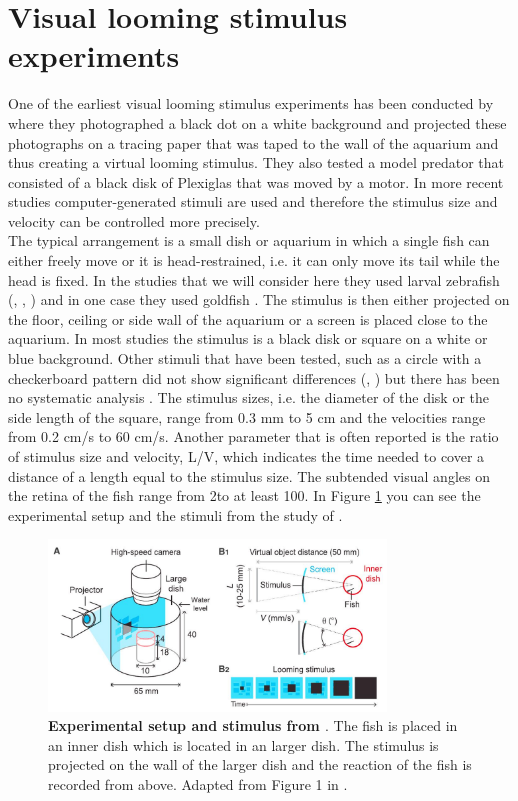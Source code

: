 \documentclass[a4paper,10pt,hidelinks]{scrreprt}
\begin{document}
	\section{Visual looming stimulus experiments}
	One of the earliest visual looming stimulus experiments has been conducted by 
	\cite{Dill1974} where they photographed a black dot on a white background and projected these 
	photographs on a tracing paper that was taped to the wall of the aquarium and thus creating a virtual looming stimulus.
	They also tested a model predator that consisted of a black disk of Plexiglas that was moved by a motor.
	In more recent studies computer-generated stimuli are used and therefore the stimulus size 
	and velocity can be controlled more precisely.\\
	The typical arrangement is a small dish or aquarium in which a single fish can either freely 
	move or it is head-restrained, i.e. it can only move its tail while the head is fixed. 
	In the studies that we will consider here they used larval zebrafish (\cite{Temizer2015}, 
	\cite{Dunn2016}, \cite{Bhattacharyya2017}) and in one case they used goldfish 
	\citep{Preuss2006}.
	The stimulus is then either projected on the floor, ceiling or side wall of the aquarium or a 
	screen is placed close to the aquarium.
	In most studies the stimulus is a black disk or square on a white or blue background.
	Other stimuli that have been tested, such as a circle with a checkerboard pattern did not show significant differences (\cite{Preuss2006}, \cite{Dunn2016}) but there has been no systematic analysis .
	The stimulus sizes, i.e. the diameter of the disk or the side length of the square, range from 0.3 mm to 5 cm and the velocities range from 0.2 cm/s to 60 cm/s.
    Another parameter that is often reported is the ratio of stimulus size and velocity, L/V, which indicates the time needed to cover a distance of a length equal to the stimulus size.
	The subtended visual angles on the retina of the fish range from 2\textdegree to at least 
	100\textdegree.
    In Figure \ref{fig:expm_setup} you can see the experimental setup and the stimuli from the study of \cite{Bhattacharyya2017}.
    \begin{figure}[H]
    	\begin{center}
			\includegraphics[width=0.8\textwidth]{bhattacharyya_exp_setup.jpeg}
    	\end{center}
    	\caption{\textbf{Experimental setup and stimulus from \cite{Bhattacharyya2017}}. The fish is placed in an inner dish which is located in an larger dish. The stimulus is projected on the wall of the larger dish and the reaction of the fish is recorded from above. Adapted from Figure 1 in \cite{Bhattacharyya2017}.}
    	\label{fig:expm_setup}
    \end{figure}
\end{document}
